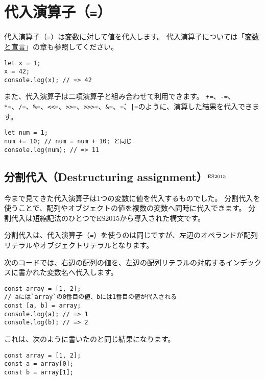 \hypertarget{assignment-operator}{%
\section{\texorpdfstring{代入演算子（\texttt{=}）}{代入演算子（=）}}\label{assignment-operator}}

代入演算子（\texttt{=}）は変数に対して値を代入します。
代入演算子については「\href{../variables/README.md}{変数と宣言}」の章も参照してください。

\begin{lstlisting}
let x = 1;
x = 42;
console.log(x); // => 42
\end{lstlisting}

また、代入演算子は二項演算子と組み合わせて利用できます。
\texttt{+=}、\texttt{-=}、\texttt{*=}、\texttt{/=}、\texttt{\%=}、\texttt{<<=}、\texttt{>>=}、\texttt{>>>=}、\texttt{\&=}、\texttt{\^=}、\texttt{|=}のように、演算した結果を代入できます。

\begin{lstlisting}
let num = 1;
num += 10; // num = num + 10; と同じ
console.log(num); // => 11
\end{lstlisting}

\hypertarget{destructuring-assignment}{%
\subsection{分割代入（Destructuring
assignment）{$^{\rm ES2015}$}}\label{destructuring-assignment}}

今まで見てきた代入演算子は1つの変数に値を代入するものでした。
分割代入を使うことで、配列やオブジェクトの値を複数の変数へ同時に代入できます。
分割代入は短縮記法のひとつでES2015から導入された構文です。

分割代入は、代入演算子（\texttt{=}）を使うのは同じですが、左辺のオペランドが配列リテラルやオブジェクトリテラルとなります。

次のコードでは、右辺の配列の値を、左辺の配列リテラルの対応するインデックスに書かれた変数名へ代入します。

\begin{lstlisting}
const array = [1, 2];
// aには`array`の0番目の値、bには1番目の値が代入される
const [a, b] = array;
console.log(a); // => 1
console.log(b); // => 2
\end{lstlisting}

これは、次のように書いたのと同じ結果になります。

\begin{lstlisting}
const array = [1, 2];
const a = array[0];
const b = array[1];
\end{lstlisting}

